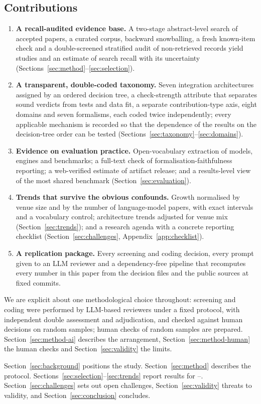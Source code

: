 \subsection{Contributions}
\begin{enumerate}
  \item \textbf{A recall-audited evidence base.} A two-stage abstract-level search of  accepted papers, a curated corpus, backward snowballing, a fresh known-item check and a double-screened stratified audit of non-retrieved records yield  studies and an estimate of search recall with its uncertainty (Sections~\ref{sec:method}--\ref{sec:selection}).
  \item \textbf{A transparent, double-coded taxonomy.} Seven integration architectures assigned by an ordered decision tree, a check-strength attribute that separates sound verdicts from tests and data fit, a separate contribution-type axis, eight domains and seven formalisms, each coded twice independently; every applicable mechanism is recorded so that the dependence of the results on the decision-tree order can be tested (Sections~\ref{sec:taxonomy}--\ref{sec:domains}).
  \item \textbf{Evidence on evaluation practice.} Open-vocabulary extraction of models, engines and benchmarks; a full-text check of formalisation-faithfulness reporting; a web-verified estimate of artifact release; and a results-level view of the most shared benchmark (Section~\ref{sec:evaluation}).
  \item \textbf{Trends that survive the obvious confounds.} Growth normalised by venue size and by the number of language-model papers, with exact intervals and a vocabulary control; architecture trends adjusted for venue mix (Section~\ref{sec:trends}); and a research agenda with a concrete reporting checklist (Section~\ref{sec:challenges}, Appendix~\ref{app:checklist}).
  \item \textbf{A replication package.} Every screening and coding decision, every prompt given to an LLM reviewer and a dependency-free pipeline that recomputes every number in this paper from the decision files and the public sources at fixed commits.
\end{enumerate}

We are explicit about one methodological choice throughout: screening and coding were performed by LLM-based reviewers under a fixed protocol, with independent double assessment and adjudication\ifhumancheck, and checked against human decisions on random samples\else; human checks of random samples are prepared\fi. Section~\ref{sec:method-ai} describes the arrangement, Section~\ref{sec:method-human} the human checks and Section~\ref{sec:validity} the limits.

Section~\ref{sec:background} positions the study. Section~\ref{sec:method} describes the protocol. Sections~\ref{sec:selection}--\ref{sec:trends} report results for --. Section~\ref{sec:challenges} sets out open challenges, Section~\ref{sec:validity} threats to validity, and Section~\ref{sec:conclusion} concludes.
